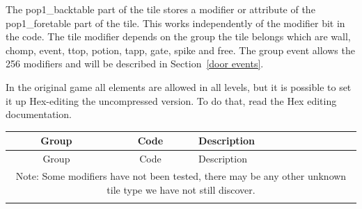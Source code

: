 \documentclass{article}
\begin{document}
 The pop1\_backtable part of the tile stores a modifier or attribute of the
 pop1\_foretable part of the tile. This works independently of the modifier
 bit in the code. The tile modifier depends on the group the tile belongs
 which are wall, chomp, event, ttop, potion, tapp, gate, spike and free.
 The group event allows the 256 modifiers and will be described in Section~\ref{door events}.
 
 In the original game all elements are allowed in all levels, but it is possible to set it up
Hex-editing the uncompressed version. To do that, read the Hex editing documentation.

\begin{longtable}{ccl}

\hline
 Group & Code & Description \\
\hline
\endfirsthead
\hline
 Group & Code & Description \\
\hline
\endhead
\multicolumn{3}{p{8cm}}{
 Note: Some modifiers have not been tested, there may be any other unknown
       tile type we have not still discover.

} \\
\endlastfoot


\end{longtable}
\end{document}
